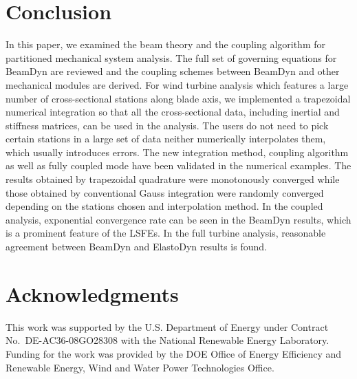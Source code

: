 \documentclass{aiaa-tc}
\begin{document}
\section{Conclusion}
In this paper, we examined the beam theory and the coupling algorithm for partitioned mechanical system analysis. The full set of governing equations for BeamDyn are reviewed and the coupling schemes between BeamDyn and other mechanical modules are derived. For wind turbine analysis which features a large number of cross-sectional stations along blade axis, we implemented a trapezoidal numerical integration so that all the cross-sectional data, including inertial and stiffness matrices, can be used in the analysis. The users do not need to pick certain stations in a large set of data neither numerically interpolates them, which usually introduces errors. The new integration method, coupling algorithm as well as fully coupled mode have been validated in the numerical examples. The results obtained by trapezoidal quadrature were monotonously converged while those obtained by conventional Gauss integration were randomly converged depending on the stations chosen and interpolation method. In the coupled analysis, exponential convergence rate can be seen in the BeamDyn results, which is a prominent feature of the LSFEs. In the full turbine analysis, reasonable agreement between BeamDyn and ElastoDyn results is found.
  
\section*{Acknowledgments} 

This work was supported by the U.S. Department of Energy under Contract No.\
DE-AC36-08GO28308 with the National Renewable Energy Laboratory. Funding for the work was provided by the DOE Office of Energy Efficiency and Renewable Energy, Wind and Water Power Technologies Office.   



\end{document}
